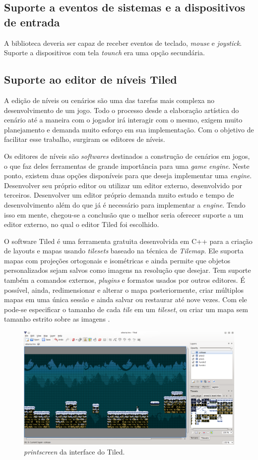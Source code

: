 \subsection{Suporte a eventos de sistemas e a dispositivos de entrada}
%
A biblioteca deveria ser capaz de receber eventos de teclado, \textit{mouse} e \textit{joystick}. Suporte a dispositivos com tela \textit{tounch} era uma opção secundária.
%
\subsection{Suporte ao editor de níveis Tiled}
%
A edição de níveis ou cenários são uma das tarefas mais complexa no desenvolvimento de um jogo. Todo o processo desde a elaboração artística do cenário até a maneira com o jogador irá interagir com o mesmo, exigem muito planejamento e demanda muito esforço em sua implementação. Com o objetivo de facilitar esse trabalho, surgiram os editores de níveis. 
\par
Os editores de níveis são \textit{softwares} destinados a construção de cenários em jogos, o que faz deles ferramentas de grande importância para uma \textit{game engine}. Neste ponto, existem duas opções disponíveis para que deseja implementar uma \textit{engine}. Desenvolver seu próprio editor ou utilizar um editor externo, desenvolvido por terceiros. Desenvolver um editor próprio demanda muito estudo e tempo de desenvolvimento além do que já é necessário para implementar a \textit{engine}. Tendo isso em mente, chegou-se a conclusão que o melhor seria oferecer suporte a um editor externo, no qual o editor Tiled foi escolhido. 
\par
O software Tiled \cite{SiteTiled} é uma ferramenta gratuita desenvolvida em C++ para a criação de layouts e mapas usando \textit{tilesets} baseado na técnica de \textit{Tilemap}. Ele suporta mapas com projeções ortogonais e isométricas e ainda permite que 
objetos personalizados sejam salvos como imagens na resolução que desejar. Tem suporte também a comandos externos, 
\textit{plugins} e formatos usados por outros editores. É possível, ainda, redimensionar e alterar o mapa posteriormente, criar múltiplos mapas em uma única sessão e ainda salvar ou restaurar até nove vezes. Com ele pode-se especificar o tamanho de cada \textit{tile} em um \textit{tileset}, ou criar um mapa sem tamanho estrito sobre as imagens \cite{TiledTutorial}.
%
\begin{figure}[H]
    \centering
    \includegraphics[scale = 0.45]{Imagens/Tiled.png}
    \caption{\textit{printscreen} da interface do Tiled.}
    \label{tiledGUI}
\end{figure}
